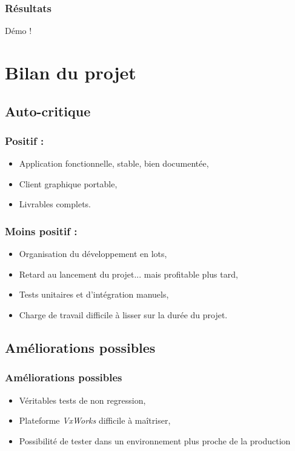 \documentclass{beamer}
\begin{document}
	\begin{frame}
		\frametitle{Résultats}
		Démo !
	\end{frame}

\section{Bilan du projet}
	\subsection{Auto-critique}
	\begin{frame}
	\frametitle{Positif :}
	\begin{itemize}
		\item Application fonctionnelle, stable, bien documentée,
		\item Client graphique portable,
		\item Livrables complets.
	\end{itemize}
	\end{frame}

	\begin{frame}
	\frametitle{Moins positif :}
	\begin{itemize}
		\item Organisation du développement en lots,
		\item Retard au lancement du projet... mais profitable plus tard,
		\item Tests unitaires et d'intégration manuels,
		\item Charge de travail difficile à lisser sur la durée du projet.
	\end{itemize}
	\end{frame}

	\subsection{Améliorations possibles}
	\begin{frame}
	\frametitle{Améliorations possibles}
	\begin{itemize}
		\item Véritables tests de non regression,
		\item Plateforme \textit{VxWorks} difficile à maîtriser,
		\item Possibilité de tester dans un environnement plus proche de la
production
	\end{itemize}
	\end{frame}
\end{document}
